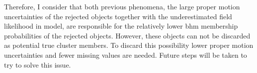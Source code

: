 Therefore, I consider that both previous phenomena, the large proper motion uncertainties of the rejected objects together with the underestimated field likelihood in \citet{Bouy2015} model, are responsible for the relatively lower \gls{bhm} membership probabilities of the rejected objects. However, these objects can not be discarded as potential true cluster members. To discard this possibility lower proper motion uncertainties and fewer missing values are needed. Future steps will be taken to try to solve this issue.

 \begin{figure}[ht!]
\begin{center}

\end{center}
\end{figure}
